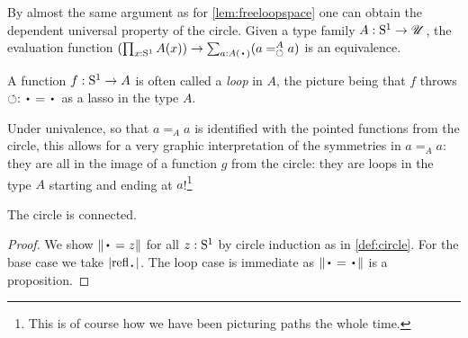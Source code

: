 \begin{remark}\label{rem:dep-univ-prop-circle}
By almost the same argument as for \cref{lem:freeloopspace}
one can obtain the dependent universal property of the circle.
Given a type family $A:{\mathrm{S}^1}\to{\mathscr{U}}$, the evaluation function
$(\prod_{x:\Sc} A(x))\to \sum_{a:A(\base)}(\pathover a A {\Sloop} a)$
is an equivalence.
\end{remark}

\begin{marginfigure}
\end{marginfigure}
\begin{remark}
  A function $f:{\mathrm{S}^1}\to A$ is often called a \emph{loop} in $A$, the
  picture being that $f$ throws $\Sloop:\base=\base$ as a lasso in the
  type $A$.

  Under univalence, so that $a=_Aa$ is identified with the pointed
  functions from the circle, this allows for a very graphic
  interpretation of the symmetries in $a=_Aa$: they are all in the
  image of a function $g$ from the circle: they are loops in the type
  $A$ starting and ending at $a$!\footnote{%
    This is of course how we have been
    picturing paths the whole time.}
\end{remark}

\begin{lemma}\label{lem:circleisconnected}
  The circle is connected.
\end{lemma}
\begin{proof}
We show $\Trunc{\base=z}$ for all $z:{\mathrm{S}^1}$ by circle induction
as in \cref{def:circle}.
For the base case we take $\trunc{\refl{\base}}$.
The loop case is immediate as $\Trunc{\base=\base}$ is a proposition.
\end{proof}

